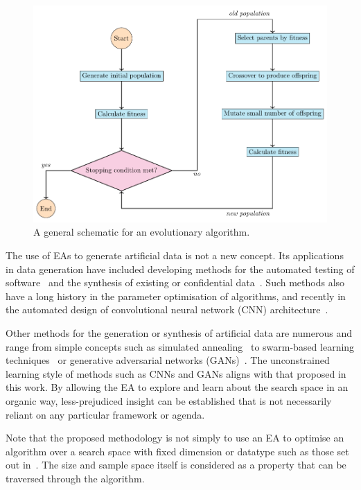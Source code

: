 \documentclass[smallextended]{svjour3}
\newlength{\imgwidth}
\begin{document}
\begin{figure}[htbp]
    \centering
    \includegraphics[width=\imgwidth]{Fig2.pdf}
    \caption{%
        A general schematic for an evolutionary algorithm.
    }\label{fig:flowchart}
\end{figure}

The use of EAs to generate artificial data is not a new concept. Its
applications in data generation have included developing methods for the
automated testing of software~\cite{Koleejan2015,Michael2001,Sharifipour2018}
and the synthesis of existing or confidential data~\cite{Chen2016}. Such methods
also have a long history in the parameter optimisation of algorithms, and
recently in the automated design of convolutional neural network (CNN)
architecture~\cite{Suganuma2017,Sun2018}.

Other methods for the generation or synthesis of artificial data are numerous
and range from simple concepts such as simulated annealing~\cite{Matejka2017}
to swarm-based learning techniques~\cite{Abualigah2018} or generative
adversarial networks (GANs)~\cite{Goodfellow2014}. The unconstrained learning
style of methods such as CNNs and GANs aligns with that proposed in this work.
By allowing the EA to explore and learn about the search space in an organic
way, less-prejudiced insight can be established that is not necessarily reliant
on any particular framework or agenda.

Note that the proposed methodology is not simply to use an EA to optimise an
algorithm over a search space with fixed dimension or datatype such as those set
out in~\cite{Chen2016}. The size and sample space itself is considered as a
property that can be traversed through the algorithm.
\end{document}
